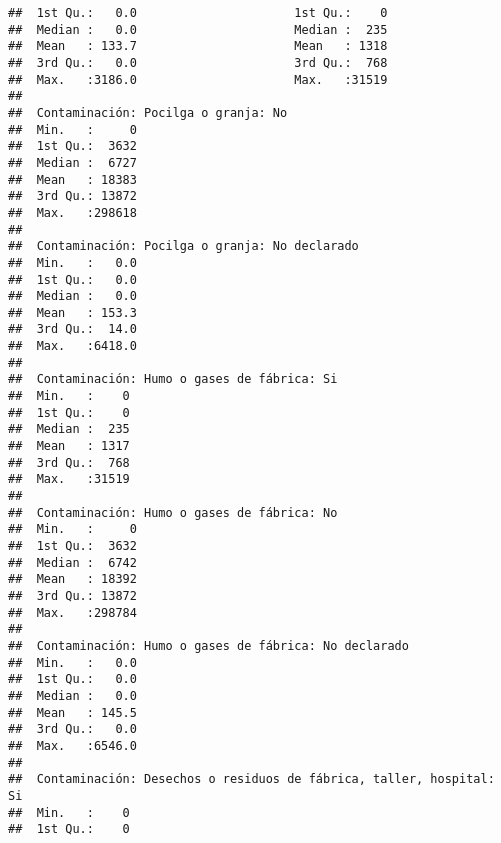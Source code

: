 \documentclass[11pt,]{article}
\begin{document}
\begin{verbatim}
##  1st Qu.:   0.0                      1st Qu.:    0                      
##  Median :   0.0                      Median :  235                      
##  Mean   : 133.7                      Mean   : 1318                      
##  3rd Qu.:   0.0                      3rd Qu.:  768                      
##  Max.   :3186.0                      Max.   :31519                      
##                                                                         
##  Contaminación: Pocilga o granja: No
##  Min.   :     0                     
##  1st Qu.:  3632                     
##  Median :  6727                     
##  Mean   : 18383                     
##  3rd Qu.: 13872                     
##  Max.   :298618                     
##                                     
##  Contaminación: Pocilga o granja: No declarado
##  Min.   :   0.0                               
##  1st Qu.:   0.0                               
##  Median :   0.0                               
##  Mean   : 153.3                               
##  3rd Qu.:  14.0                               
##  Max.   :6418.0                               
##                                               
##  Contaminación: Humo o gases de fábrica: Si
##  Min.   :    0                             
##  1st Qu.:    0                             
##  Median :  235                             
##  Mean   : 1317                             
##  3rd Qu.:  768                             
##  Max.   :31519                             
##                                            
##  Contaminación: Humo o gases de fábrica: No
##  Min.   :     0                            
##  1st Qu.:  3632                            
##  Median :  6742                            
##  Mean   : 18392                            
##  3rd Qu.: 13872                            
##  Max.   :298784                            
##                                            
##  Contaminación: Humo o gases de fábrica: No declarado
##  Min.   :   0.0                                      
##  1st Qu.:   0.0                                      
##  Median :   0.0                                      
##  Mean   : 145.5                                      
##  3rd Qu.:   0.0                                      
##  Max.   :6546.0                                      
##                                                      
##  Contaminación: Desechos o residuos de fábrica, taller, hospital: Si
##  Min.   :    0                                                      
##  1st Qu.:    0                                                      

\end{verbatim}
\end{document}
